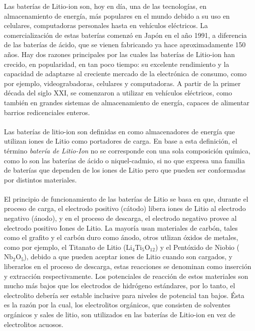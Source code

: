 \documentclass[10pt,a4paper]{article}
\begin{document}
\noindent Las baterías de Litio-ion son, hoy en día, una de las tecnologías, en almacenamiento de energía, más populares en el mundo debido a su uso en celulares, computadoras personales hasta en vehículos eléctricos. La comercialización de estas baterías comenzó en Japón en el año 1991, a diferencia de las baterías de ácido, que se vienen fabricando ya hace aproximadamente 150 años. Hay dos razones principales por las cuales las baterías de Litio-ion han crecido, en popularidad, en tan poco tiempo: su excelente rendimiento y la capacidad de adaptarse al creciente mercado de la electrónica de consumo, como por ejemplo, videograbadoras, celulares y computadoras. A partir de la primer década del siglo XXI, se comenzaron a utilizar en vehículos eléctricos, como también en grandes sistemas de almacenamiento de energía, capaces de alimentar barrios redicenciales enteros.\\
\\
\noindent Las baterías de litio-ion son definidas en \cite{def_liion} como almacenadores de energía que utilizan iones de Litio como portadores de carga. En base a esta definición, el término \emph{batería de Litio-Ion} no se corresponde con una sola composición química, como lo son las baterías de ácido o niquel-cadmio, si no que expresa una familia de baterías que dependen de los iones de Litio pero que pueden ser conformadas por distintos materiales.\\
\\
\noindent El principio de funcionamiento de las baterías de Litio se basa en que, durante el proceso de carga, el electrodo positivo (cátodo) libera iones de Litio al electrodo negativo (ánodo), y  en el proceso de descarga, el electrodo negativo provee al electrodo positivo Iones de Litio. La mayoría usan materiales de carbón, tales como el grafito y el carbón duro como ánodo, otros utlizan óxidos de metales, como por ejemplo, el Titanato de Litio ($\mathrm{Li_4Ti_5O_{12}}$) y el Pentóxido de Niobio ($\mathrm{Nb_2O_5}$), debido a que pueden aceptar iones de Litio cuando son cargados, y liberarlos en el proceso de descarga, estas reacciones se denominan como inserción y extracción respectivamente. Los potenciales de reacción de estos materiales son mucho más bajos que los electrodos de hidrógeno estándares, por lo tanto, el electrolito debería ser estable inclusive para niveles de potencial tan bajos. Ésta es la razón por la cual, los electrolitos orgánicos, que consisten de solventes orgánicos y sales de litio, son utilizados en las baterías de Litio-ion en vez de electrolitos acuosos.\\
\end{document}
